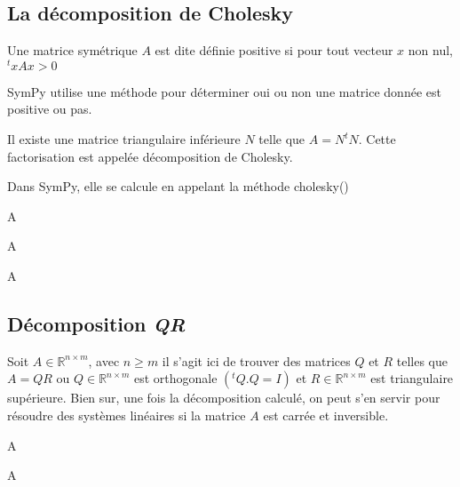 \subsection{La décomposition de Cholesky}
\begin{definition}
Une matrice symétrique $A$ est dite définie positive si pour tout vecteur $x$ non nul, ${}^t \!xAx>0$
\end{definition}
\begin{example}
SymPy utilise une méthode pour déterminer oui ou non une matrice donnée est positive ou pas.
\end{example}
\begin{definition}
Il existe une matrice triangulaire inférieure $N$ telle que $A = N^{t}N$. Cette factorisation est appelée décomposition de Cholesky. 
\end{definition}
Dans SymPy, elle se calcule en appelant la méthode cholesky()
\begin{example}

\end{example}
\begin{exercise}
A
\end{exercise}
\begin{exercise}
A
\end{exercise}
\begin{exercise}
A
\end{exercise}
\subsection{Décomposition \textit{QR}}
Soit $A \in \mathbb{R}^{n \times m}$, avec $n\geq m$ il s'agit ici de trouver des matrices $Q$ et $R$ telles que $A=QR$ ou $Q \in \mathbb{R}^{n \times m}$ est orthogonale $\left( {}^t\!Q.Q = I\right)$ et $R \in \mathbb{R}^{n \times m}$ est triangulaire supérieure. Bien sur, une fois la décomposition calculé, on peut s'en servir pour résoudre des systèmes linéaires si la matrice $A$ est carrée et inversible. 
\begin{exercise}
A
\end{exercise}
\begin{exercise}
A
\end{exercise}
